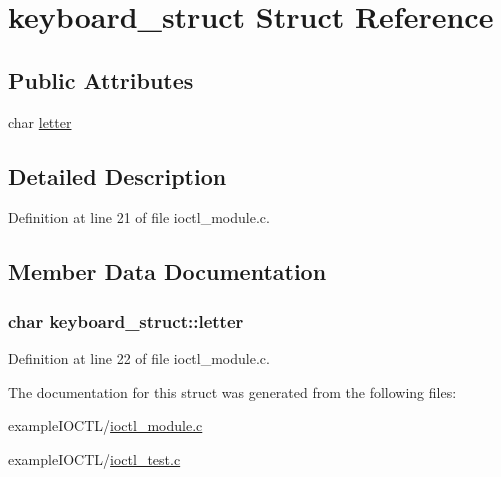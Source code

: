 \hypertarget{structkeyboard__struct}{\section{keyboard\-\_\-struct Struct Reference}
\label{structkeyboard__struct}
}
\subsection*{Public Attributes}
\begin{DoxyCompactItemize}
\item 
char \hyperlink{structkeyboard__struct_a45a03851458f84e78403edde1ab798e0}{letter}
\end{DoxyCompactItemize}


\subsection{Detailed Description}


Definition at line 21 of file ioctl\-\_\-module.\-c.



\subsection{Member Data Documentation}
\hypertarget{structkeyboard__struct_a45a03851458f84e78403edde1ab798e0}{
\subsubsection[{letter}]{\setlength{\rightskip}{0pt plus 5cm}char keyboard\-\_\-struct\-::letter}}\label{structkeyboard__struct_a45a03851458f84e78403edde1ab798e0}


Definition at line 22 of file ioctl\-\_\-module.\-c.



The documentation for this struct was generated from the following files\-:\begin{DoxyCompactItemize}
\item 
example\-I\-O\-C\-T\-L/\hyperlink{ioctl__module_8c}{ioctl\-\_\-module.\-c}\item 
example\-I\-O\-C\-T\-L/\hyperlink{ioctl__test_8c}{ioctl\-\_\-test.\-c}\end{DoxyCompactItemize}
